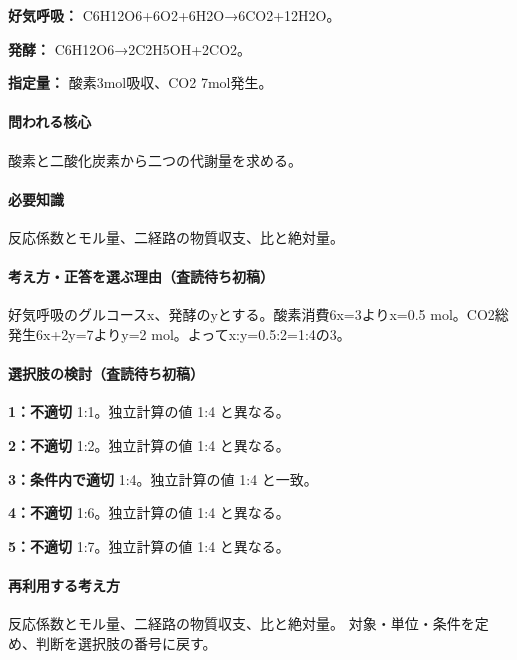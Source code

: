 \noindent\textbf{好気呼吸：} C6H12O6+6O2+6H2O→6CO2+12H2O。\par

\noindent\textbf{発酵：} C6H12O6→2C2H5OH+2CO2。\par

\noindent\textbf{指定量：} 酸素3mol吸収、CO2 7mol発生。\par

\paragraph{問われる核心} 酸素と二酸化炭素から二つの代謝量を求める。

\paragraph{必要知識} 反応係数とモル量、二経路の物質収支、比と絶対量。

\paragraph{考え方・正答を選ぶ理由（査読待ち初稿）} 好気呼吸のグルコースx、発酵のyとする。酸素消費6x=\allowbreak{}3よりx=\allowbreak{}0.5 mol。CO2総発生6x+2y=\allowbreak{}7よりy=\allowbreak{}2 mol。よってx:y=\allowbreak{}0.5:2=\allowbreak{}1:4の3。

\paragraph{選択肢の検討（査読待ち初稿）}\mbox{}\par

\noindent\textbf{1：不適切} 1:1。独立計算の値 1:4 と異なる。\par

\noindent\textbf{2：不適切} 1:2。独立計算の値 1:4 と異なる。\par

\noindent\textbf{3：条件内で適切} 1:4。独立計算の値 1:4 と一致。\par

\noindent\textbf{4：不適切} 1:6。独立計算の値 1:4 と異なる。\par

\noindent\textbf{5：不適切} 1:7。独立計算の値 1:4 と異なる。\par

\paragraph{再利用する考え方} 反応係数とモル量、二経路の物質収支、比と絶対量。 対象・単位・条件を定め、判断を選択肢の番号に戻す。

